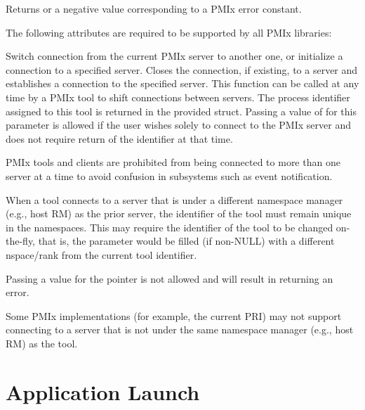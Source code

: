 Returns  or a negative value corresponding to a PMIx error constant.

\reqattrstart
The following attributes are required to be supported by all \ac{PMIx} libraries:


\reqattrend

\descr

Switch connection from the current \ac{PMIx} server to another one, or initialize a connection to a specified server. Closes the connection, if existing, to a server and establishes a connection to the specified server. This function can be called at any time by a \ac{PMIx} tool to shift connections between servers.
The process identifier assigned to this tool is returned in the provided  struct. Passing a value of  for this parameter is allowed if the user wishes solely to connect to the \ac{PMIx} server and does not require return of the identifier at that time.

\adviceimplstart
\ac{PMIx} tools and clients are prohibited from being connected to more than one server at a time to avoid confusion in subsystems such as event notification.

When a tool connects to a server that is under a different namespace manager (e.g., host \ac{RM}) as the prior server, the identifier of the tool must remain unique in the namespaces. This may require the identifier of the tool to be changed on-the-fly, that is, the  parameter would be filled (if non-NULL) with a different nspace/rank from the current tool identifier.
\adviceimplend

\adviceuserstart
Passing a  value for the  pointer is not allowed and will result in returning an error.

Some \ac{PMIx} implementations (for example, the current \ac{PRI}) may not support connecting to a server that is not under the same namespace manager (e.g., host \ac{RM}) as the tool.
\adviceuserend


\section{Application Launch}
\label{chap:api_tools:launch}

